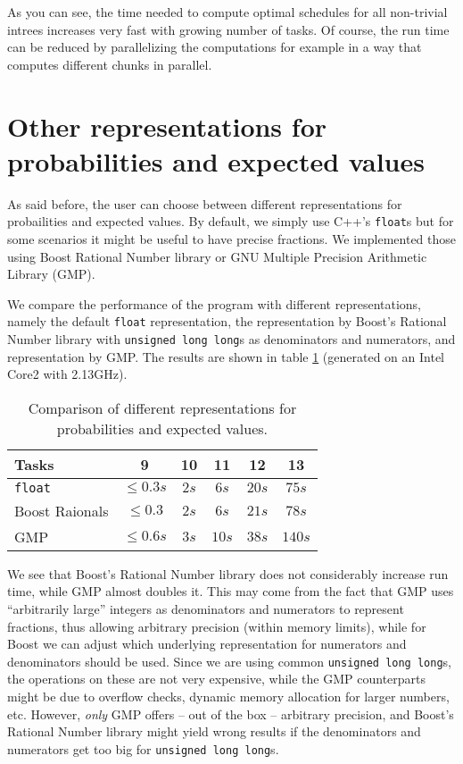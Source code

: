 As you can see, the time needed to compute optimal schedules for all non-trivial intrees increases very fast with growing number of tasks. Of course, the run time can be reduced by parallelizing the computations for example in a way that computes different chunks in parallel.

\section{Other representations for probabilities and expected values}
\label{sec:benchmarks-myfloat-variations}

As said before, the user can choose between different representations for probailities and expected values. By default, we simply use C++'s \texttt{float}s but for some scenarios it might be useful to have precise fractions. We implemented those using Boost Rational Number library or GNU Multiple Precision Arithmetic Library (GMP).

We compare the performance of the program with different representations, namely the default \texttt{float} representation, the representation by Boost's Rational Number library with \texttt{unsigned long long}s as denominators and numerators, and representation by GMP. The results are shown in table \ref{tab:comparison-myfloat-variants} (generated on an Intel Core2 with 2.13GHz).

\begin{table}[th]
  \centering
  \begin{tabular}[ht]{lccccc}
    Tasks & 9 & 10 & 11 & 12 & 13 \\
    \hline 
    \texttt{float} & $\leq 0.3s$ & $2s$ & $6s$ & $20s$ & $75s$ \\
    Boost Raionals & $\leq 0.3$ & $2s$ & $6s$ & $21s$ & $78s$ \\
    GMP & $\leq 0.6s$ & $3s$ & $10s$ & $38s$ & $140s$
  \end{tabular}
  \caption{Comparison of different representations for probabilities and expected values.}
  \label{tab:comparison-myfloat-variants}
\end{table}

We see that Boost's Rational Number library does not considerably increase run time, while GMP almost doubles it. This may come from the fact that GMP uses ``arbitrarily large'' integers as denominators and numerators to represent fractions, thus allowing arbitrary precision (within memory limits), while for Boost we can adjust which underlying representation for numerators and denominators should be used. Since we are using common \texttt{unsigned long long}s, the operations on these are not very expensive, while the GMP counterparts might be due to overflow checks, dynamic memory allocation for larger numbers, etc. However, \emph{only} GMP offers -- out of the box -- arbitrary precision, and Boost's Rational Number library might yield wrong results if the denominators and numerators get too big for \texttt{unsigned long long}s.

